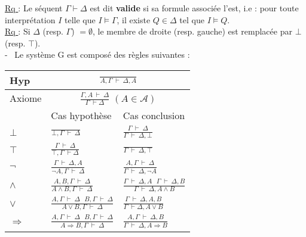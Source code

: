 \documentclass[11pt,a4paper]{article}
\begin{document}
\underline{Rq }: Le séquent $\Gamma \vdash \Delta$ est dit \textbf{valide} si sa formule associée l'est, i.e : pour toute interprétation $I$ telle que $I \models \Gamma$, il existe $Q\in \Delta$ tel que $I \models Q$.\\
\underline{Rq }: Si $\Delta$ (resp. $\Gamma$) $= \emptyset$, le membre de droite (resp. gauche) est remplacée par $\bot$ (resp. $\top$). \\

- \ Le système G est composé des règles suivantes : \\

\begin{tabular}{|C{3cm}|C{6cm}|C{7cm}|}
  \hline
  Hyp &   \\
  \hline
  Axiome &   \\
  \hline
  & Cas hypothèse & Cas conclusion \\
  \hline
  $\bot$ & {\Large $\frac{}{\bot , \Gamma \ \vdash \ \Delta}$} & {\Large $\frac{\Gamma \ \vdash \ \Delta}{\Gamma \ \vdash \ \Delta, \bot}$} \\
  \hline
  $\top$ & {\Large $\frac{\Gamma \ \vdash \ \Delta}{\top,\Gamma \ \vdash \Delta}$} & {\Large $\frac{}{\Gamma \ \vdash \ \Delta, \top}$}  \\
  \hline
  $\lnot$ & {\Large $\frac{\Gamma \  \vdash \ \Delta,A  }{\lnot A,\Gamma \  \vdash \ \Delta}$}  & {\Large $\frac{A,\Gamma \ \vdash \ \Delta}{\Gamma \  \vdash \ \Delta, \lnot A }$} \\
  \hline
  $\land$ & {\Large $\frac{A,B,\Gamma \ \vdash \ \Delta}{A\land B, \Gamma \ \vdash \ \Delta}$} & {\Large $\frac{\Gamma \  \vdash \ \Delta,A \ \ \ \Gamma \ \vdash \ \Delta, B }{\Gamma \  \vdash \ \Delta, A\land B }$} \\
  \hline
  $\lor$ & {\Large $\frac{A,\Gamma \  \vdash \ \Delta \ \ \ B,\Gamma \ \vdash \ \Delta}{A\lor B,\Gamma \  \vdash \ \Delta }$} & {\Large $\frac{\Gamma \  \vdash \ \Delta,A,B}{\Gamma \  \vdash \Delta,A\lor B  }$} \\
  \hline
  $\Rightarrow$ & {\Large $\frac{A,\Gamma \  \vdash \ \Delta	 \ \ \ B,\Gamma \ \vdash \ \Delta}{A \Rightarrow B,\Gamma \  \vdash \ \Delta}$} & {\Large $\frac{A,\Gamma \  \vdash \ \Delta,B}{\Gamma \  \vdash \ \Delta,A \Rightarrow B}$} \\
  \hline
\end{tabular}
\\
\\
\end{document}
